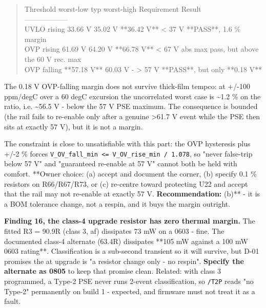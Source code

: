 \documentclass[11pt,a4paper]{article}
\begin{document}
\begin{quote}\small\ttfamily\raggedright
\textbar{} Threshold \textbar{} worst-low \textbar{} typ \textbar{} worst-high \textbar{} Requirement \textbar{} Result \textbar{}\\
\textbar{}---\textbar{}---\textbar{}---\textbar{}---\textbar{}---\textbar{}---\textbar{}\\
\textbar{} UVLO rising \textbar{} 33.66 V \textbar{} 35.02 V \textbar{} {*}{*}36.42 V{*}{*} \textbar{} \textless{} 37 V \textbar{} {*}{*}PASS{*}{*}, 1.6 \% margin \textbar{}\\
\textbar{} OVP rising \textbar{} 61.69 V \textbar{} 64.20 V \textbar{} {*}{*}66.78 V{*}{*} \textbar{} \textless{} 67 V abs max \textbar{} pass, but above the 60 V rec. max \textbar{}\\
\textbar{} OVP falling \textbar{} {*}{*}57.18 V{*}{*} \textbar{} 60.03 V \textbar{} - \textbar{} \textgreater{} 57 V \textbar{} {*}{*}PASS{*}{*}, but only {*}{*}0.18 V{*}{*} \textbar{}
\end{quote}
The 0.18 V OVP-falling margin does not survive thick-film tempco: at +/-100 ppm/degC over a 60 degC excursion the uncorrelated worst case is \textasciitilde{}1.2 \% on the ratio, i.e. \textasciitilde{}56.5 V - below the 57 V PSE maximum. The consequence is bounded (the rail fails to re-enable only after a genuine \textgreater{}61.7 V event while the PSE then sits at exactly 57 V), but it is not a margin.

The constraint is close to unsatisfiable with this part: the OVP hysteresis plus +/-2 \% forces \texttt{V\_OV\_fall\_min \textless{}= V\_OV\_rise\_min / 1.078}, so "never false-trip below 57 V" and "guaranteed re-enable at 57 V" cannot both be held with comfort. {*}{*}Owner choice: (a) accept and document the corner, (b) specify 0.1 \% resistors on R66/R67/R73, or (c) re-centre toward protecting U22 and accept that the rail may not re-enable at exactly 57 V.\textbf{ Recommendation: }(b){*}{*} - it is a BOM tolerance change, not a respin, and it buys the margin outright.

\textbf{Finding 16, the class-4 upgrade resistor has zero thermal margin.} The fitted R3 = 90.9R (class 3, af) dissipates 73 mW on a 0603 - fine. The documented class-4 alternate (63.4R) dissipates {*}{*}105 mW against a 100 mW 0603 rating{*}{*}. Classification is a sub-second transient so it will survive, but D-01 promises the at upgrade is "a resistor change only - no respin". \textbf{Specify the alternate as 0805} to keep that promise clean. Related: with class 3 programmed, a Type-2 PSE never runs 2-event classification, so \texttt{/T2P} reads "no Type-2" permanently on build 1 - expected, and firmware must not treat it as a fault.
\end{document}

